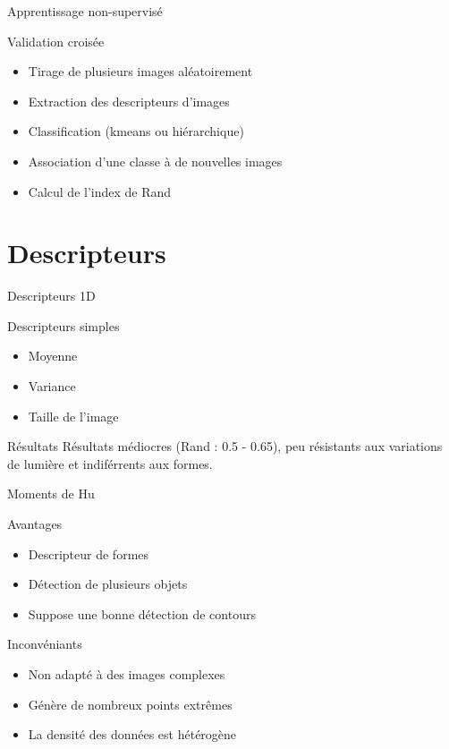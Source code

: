 \documentclass[xcolor=table]{beamer}
\begin{document}
	\begin{frame}{Apprentissage non-supervisé}
		\begin{block}{Validation croisée}
			\begin{itemize}
				\item Tirage de plusieurs images aléatoirement
				\item Extraction des descripteurs d'images
				\item Classification (kmeans ou hiérarchique)
				\item Association d'une classe à de nouvelles images
				\item Calcul de l'index de Rand
			\end{itemize}
		\end{block}
	\end{frame}


\section{Descripteurs}

	\begin{frame}{Descripteurs 1D}
		\begin{block}{Descripteurs simples}
			\begin{itemize}
				\item Moyenne
				\item Variance
				\item Taille de l'image
			\end{itemize}
		\end{block}
		\begin{block}{Résultats}
			Résultats médiocres (Rand : 0.5 - 0.65), peu résistants aux variations de lumière et indiférrents aux formes.
		\end{block}
	\end{frame}

	\begin{frame}{Moments de Hu}
		\begin{block}{Avantages}
			\begin{itemize}
				\item Descripteur de formes
				\item Détection de plusieurs objets
				\item Suppose une bonne détection de contours
			\end{itemize}
		\end{block}
		\begin{block}{Inconvéniants}
			\begin{itemize}
				\item Non adapté à des images complexes
				\item Génère de nombreux points extrêmes
				\item La densité des données est hétérogène
			\end{itemize}
		\end{block}
	\end{frame}
\end{document}
